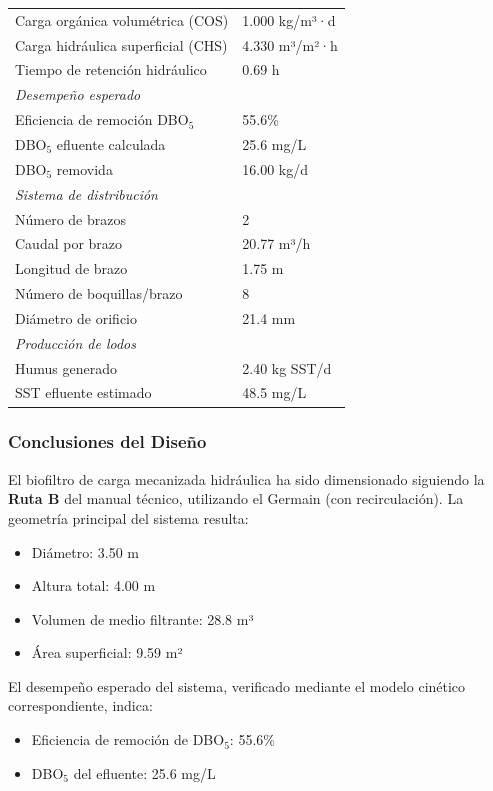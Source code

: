 \documentclass[12pt,a4paper]{article}
\begin{document}
\begin{longtable}{ll}
Carga orgánica volumétrica (COS) & 1.000 kg/m³·d \\
Carga hidráulica superficial (CHS) & 4.330 m³/m²·h \\
Tiempo de retención hidráulico & 0.69 h \\
\midrule
\multicolumn{2}{l}{\textit{Desempeño esperado}} \\
Eficiencia de remoción DBO$_5$ & 55.6\% \\
DBO$_5$ efluente calculada & 25.6 mg/L \\
DBO$_5$ removida & 16.00 kg/d \\
\midrule
\multicolumn{2}{l}{\textit{Sistema de distribución}} \\
Número de brazos & 2 \\
Caudal por brazo & 20.77 m³/h \\
Longitud de brazo & 1.75 m \\
Número de boquillas/brazo & 8 \\
Diámetro de orificio & 21.4 mm \\
\midrule
\multicolumn{2}{l}{\textit{Producción de lodos}} \\
Humus generado & 2.40 kg SST/d \\
SST efluente estimado & 48.5 mg/L \\
\end{longtable}
\endgroup

\subsubsection*{Conclusiones del Diseño}

El biofiltro de carga mecanizada hidráulica ha sido dimensionado siguiendo la \textbf{Ruta B} del manual técnico, utilizando el Germain (con recirculación). La geometría principal del sistema resulta:

\begin{itemize}[noitemsep,leftmargin=2em]
    \item Diámetro: 3.50 m
    \item Altura total: 4.00 m
    \item Volumen de medio filtrante: 28.8 m³
    \item Área superficial: 9.59 m²
\end{itemize}

El desempeño esperado del sistema, verificado mediante el modelo cinético correspondiente, indica:

\begin{itemize}[noitemsep,leftmargin=2em]
    \item Eficiencia de remoción de DBO$_5$: 55.6\%
    \item DBO$_5$ del efluente: 25.6 mg/L

\end{itemize}
\end{document}
